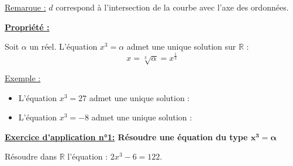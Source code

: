 \documentclass[12pt]{article}
\begin{document}
\underline{Remarque :} $d$ correspond à l'intersection de la courbe avec l'axe des ordonnées.

\vspace{5pt}
\begin{mdframed}[
    linewidth=1pt,
    roundcorner=5pt,
    linecolor=Red,
    innertopmargin=10pt,
    innerbottommargin=0pt
]
{\color{red}
\textbf{\underline{Propriété :}}

\vspace{5pt}
Soit $\alpha$ un réel. L'équation $x^3 = \alpha$ admet une unique solution sur $\mathbb{R}$ :
\[
x = \sqrt[3]{\alpha} = x^{\frac{1}{3}}
\]
}
\end{mdframed}

\vspace{5pt}
\underline{Exemple :}

\begin{itemize}
    \item L'équation $x^3 = 27$ admet une unique solution : \dotfill
    \vspace{15pt}
    \item L'équation $x^3 = -8$ admet une unique solution : \dotfill
\end{itemize}

\vspace{5pt}

\begin{mdframed}[
    linewidth=1pt,
    roundcorner=5pt,
    linecolor=RoyalBlue,
    innertopmargin=10pt,
    innerbottommargin=10pt
]
{\color{RoyalBlue}
\textbf{\underline{Exercice d'application n°1:} Résoudre une équation du type 
$\bm{x^3 = \alpha}$}}

\vspace{5pt}
Résoudre dans $\mathbb{R}$ l'équation : $2x^3 - 6 = 122$.

\vspace{0.5cm}
{\color{black!30}\dotfill}

\vspace{0.5cm}
{\color{black!30}\dotfill}

\vspace{0.5cm}
{\color{black!30}\dotfill}

\vspace{0.5cm}
{\color{black!30}\dotfill}

\vspace{20pt}

\end{mdframed}


\end{document}
